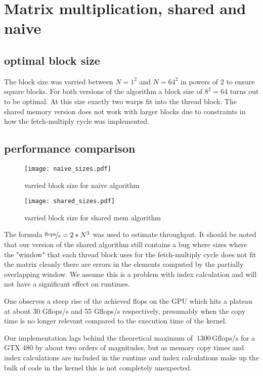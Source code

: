 \section{Matrix multiplication, shared and naive}
\subsection{optimal block size}
The block size was varried between $N=1^2$ and $N=64^2$ in powers of 2 to ensure square blocks. For both versions of the algorithm a block size of $8^2=64$ turns out to be optimal. At this size exactly two warps fit into the thread block.
The shared memory version does not work with larger blocks due to constraints in how the fetch-multiply cycle was implemented. 

\subsection{performance comparison}
\begin{figure}[h!]
    \centering
    \texttt{[image: naive\_sizes.pdf]}
    \caption{varried block size for naive algorithm}
    \end{figure}

\begin{figure}[h!]
    \centering
    \texttt{[image: shared\_sizes.pdf]}
    \caption{varried block size for shared mem algorithm}
    \end{figure}

The formula $\nicefrac{\mathrm{flops}}{\mathrm s} = 2*N^3$ was used to estimate throughput. It should be noted that our version of the shared algorithm still contains a bug where sizes where the "window" that each thread block uses for the fetch-multiply cycle does not fit the matrix cleanly there are errors in the elements computed by the partially overlapping window. We assume this is a problem with index calculation and will not have a significant effect on runtimes.

One observes a steep rise of the achieved flops on the GPU which hits a plateau at about 30 Gflops/s and 55 Gflops/s respectively, presumably when the copy time is no longer relevant compared to the execution time of the kernel.

Our implementation lags behind the theoretical maximum of $~1300 \, \mathrm{Gflops/s}$ for a GTX 480 by about two orders of magnitudes, but as memory copy times and index calculations are included in the runtime and index calculations make up the bulk of code in the kernel this is not completely unexpected.

